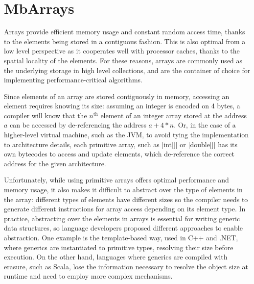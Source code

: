 \section{MbArrays}
\label{sec:mbarrays}

Arrays provide efficient memory usage and constant random access time, thanks to the elements being stored in a contiguous fashion. This is also optimal from a low level perspective as it cooperates well with processor caches, thanks to the spatial locality of the elements. For these reasons, arrays are commonly used as the underlying storage in high level collections, and are the container of choice for implementing performance-critical algorithms.

Since elements of an array are stored contiguously in memory, accessing an element requires knowing its size: assuming an integer is encoded on 4 bytes, a compiler will know that the $n^\text{th}$ element of an integer array stored at the address $a$ can be accessed by de-referencing the address $a + 4*n$. Or, in the case of a higher-level virtual machine, such as the JVM, to avoid tying the implementation to architecture details, each primitive array, such as |int[]| or |double[]| has its own bytecodes to access and update elements, which de-reference the correct address for the given architecture.


Unfortunately, while using primitive arrays offers optimal performance and memory usage, it also makes it difficult to abstract over the type of elements in the array: different types of elements have different sizes so the compiler needs to generate different instructions for array access depending on its element type. In practice, abstracting over the elements in arrays is essential for writing generic data structures, so language developers proposed different approaches to enable abstraction. One example is the template-based way, used in C++ and .NET, where generics are instantiated to primitive types, resolving their size before execution. On the other hand, languages where generics are compiled with erasure, such as Scala, lose the information necessary to resolve the object size at runtime and need to employ more complex mechanisms.

